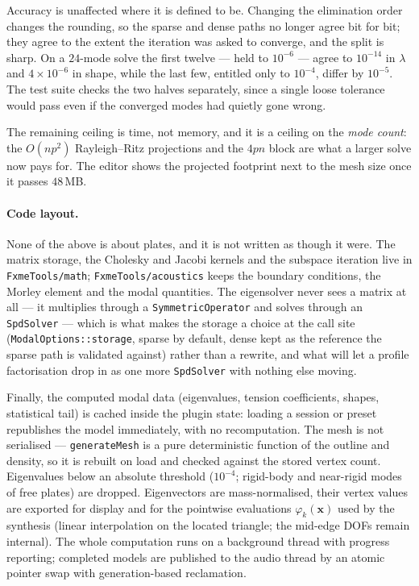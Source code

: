 \documentclass[11pt,a4paper]{article}
\newcommand{\code}[1]{\texttt{#1}}
\begin{document}
Accuracy is unaffected where it is defined to be. Changing the elimination
order changes the rounding, so the sparse and dense paths no longer agree
bit for bit; they agree to the extent the iteration was asked to converge,
and the split is sharp. On a $24$-mode solve the first twelve --- held to
$10^{-6}$ --- agree to $10^{-14}$ in $\lambda$ and $4 \times 10^{-6}$ in
shape, while the last few, entitled only to $10^{-4}$, differ by
$10^{-5}$. The test suite checks the two halves separately, since a single
loose tolerance would pass even if the converged modes had quietly gone
wrong.

The remaining ceiling is time, not memory, and it is a ceiling on the
\emph{mode count}: the $O(n p^2)$ Rayleigh--Ritz projections and the
$4pn$ block are what a larger solve now pays for. The editor shows the
projected footprint next to the mesh size once it passes $48$\,MB.

\paragraph{Code layout.}
None of the above is about plates, and it is not written as though it
were. The matrix storage, the Cholesky and Jacobi kernels and the subspace
iteration live in \code{FxmeTools/math}; \code{FxmeTools/acoustics} keeps
the boundary conditions, the Morley element and the modal quantities. The
eigensolver never sees a matrix at all --- it multiplies through a
\code{SymmetricOperator} and solves through an \code{SpdSolver} --- which
is what makes the storage a choice at the call site
(\code{ModalOptions::storage}, sparse by default, dense kept as the
reference the sparse path is validated against) rather than a rewrite, and
what will let a profile factorisation drop in as one more \code{SpdSolver}
with nothing else moving.

Finally, the computed modal data (eigenvalues, tension coefficients,
shapes, statistical tail) is cached inside the plugin state: loading a
session or preset republishes the model immediately, with no
recomputation. The mesh is not serialised --- \code{generateMesh} is a
pure deterministic function of the outline and density, so it is rebuilt
on load and checked against the stored vertex count.
%
Eigenvalues below an absolute threshold ($10^{-4}$; rigid-body and
near-rigid modes of free plates) are dropped. Eigenvectors are
mass-normalised, their vertex values are exported for display and for the
pointwise evaluations $\varphi_k(\bm{x})$ used by the synthesis (linear
interpolation on the located triangle; the mid-edge DOFs remain internal).
The whole computation runs on a background thread with progress reporting;
completed models are published to the audio thread by an atomic pointer
swap with generation-based reclamation.
\end{document}
